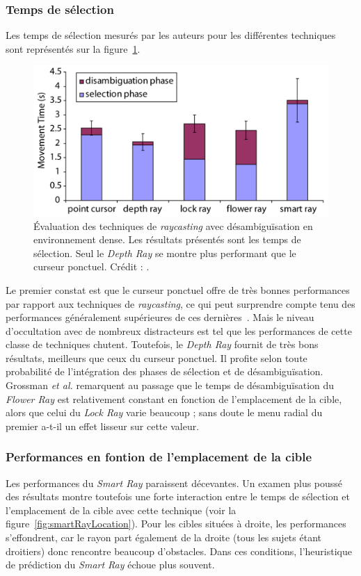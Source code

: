 	\subsubsection{Temps de sélection}
	
	Les temps de sélection mesurés par les auteurs pour les différentes techniques sont représentés sur la figure~\ref{fig:rayTimes}.

	\begin{figure}[!htb]
		\centering
		\includegraphics[width=\textwidth]{figures/ch2/rayTimes}
		\caption[Évaluation des techniques de \emph{raycasting} avec désambiguïsation]{Évaluation des techniques de \emph{raycasting} avec désambiguïsation en environnement dense. Les résultats présentés sont les temps de sélection. Seul le \emph{Depth Ray} se montre plus performant que le curseur ponctuel. Crédit : \cite{grossman2006design}.}
		\label{fig:rayTimes}
	\end{figure}

	Le premier constat est que le curseur ponctuel offre de très bonnes performances par rapport aux techniques de \emph{raycasting}, ce qui peut surprendre compte tenu des performances généralement supérieures de ces dernières~\cite{bowman2001testbed}. Mais le niveau d'occultation avec de nombreux distracteurs est tel que les performances de cette classe de techniques chutent. Toutefois, le \emph{Depth Ray} fournit de très bons résultats, meilleurs que ceux du curseur ponctuel. Il profite selon toute probabilité de l'intégration des phases de sélection et de désambiguïsation. Grossman \emph{et al.} remarquent au passage que le temps de désambiguïsation du \emph{Flower Ray} est relativement constant en fonction de l'emplacement de la cible, alors que celui du \emph{Lock Ray} varie beaucoup ; sans doute le menu radial du premier a-t-il un effet lisseur sur cette valeur.

	\subsubsection{Performances en fontion de l'emplacement de la cible}
	Les performances du \emph{Smart Ray} paraissent décevantes. Un examen plus poussé des résultats montre toutefois une forte interaction entre le temps de sélection et l'emplacement de la cible avec cette technique (voir la figure~\ref{fig:smartRayLocation}). Pour les cibles situées à droite, les performances s'effondrent, car le rayon part également de la droite (tous les sujets étant droitiers) donc rencontre beaucoup d'obstacles. Dans ces conditions, l'heuristique de prédiction du \emph{Smart Ray} échoue plus souvent.

